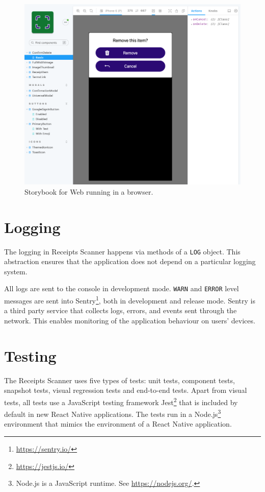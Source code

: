 \documentclass[
  digital, %
  table,   %
  oneside, %
  lof,     %
  lot,     %
]{fithesis3}
\begin{document}
\begin{figure}
    \begin{center}
        \includegraphics[width=\textwidth]{figures/other/storybook_web}
    \end{center}
    \caption{Storybook for Web running in a browser.}
    \label{fig:storybook_web}
\end{figure}

\section{Logging}
The logging in Receipts Scanner happens via methods of a \texttt{LOG} object. This abstraction ensures that the application does not depend on a particular logging system.

All logs are sent to the console in development mode. \texttt{WARN} and \texttt{ERROR} level messages are sent into Sentry\footnote{\url{https://sentry.io/}}, both in development and release mode. Sentry is a third party service that collects logs, errors, and events sent through the network. This enables monitoring of the application behaviour on users' devices.

\section{Testing}
The Receipts Scanner uses five types of tests: unit tests, component tests, snapshot tests, visual regression tests and end-to-end tests.
Apart from visual tests, all tests use a JavaScript testing framework Jest\footnote{\url{https://jestjs.io/}} that is included by default in new React Native applications. The tests run in a Node.js\footnote{Node.js is a JavaScript runtime. See \url{https://nodejs.org/}.} environment that mimics the environment of a React Native application. 
\end{document}
